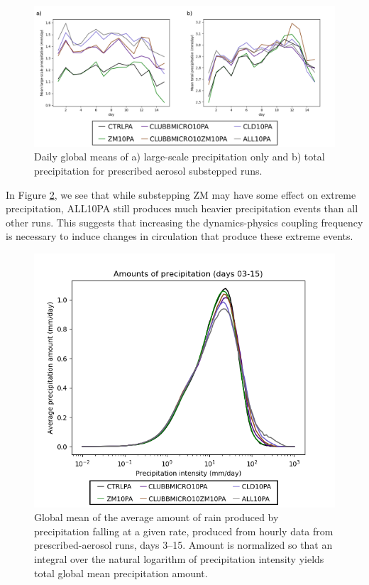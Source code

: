 \documentclass [11pt, proquest] {uwthesis}[2020/02/24]
\begin{document}
\begin{figure}
    \centering
    \includegraphics[width=6.5in]{Figure13.png}
    \caption[Rates of large-scale and total precipitation over time for short prescribed-aerosol EAMv1 runs using different forms of substepping]{Daily global means of a) large-scale precipitation only and b) total precipitation for prescribed aerosol substepped runs.}
    \label{fig:precl-prect-pa}
\end{figure}

In Figure \ref{fig:prec-intensity-pa}, we see that while substepping ZM may have some effect on extreme precipitation, ALL10PA still produces much heavier precipitation events than all other runs. This suggests that increasing the dynamics-physics coupling frequency is necessary to induce changes in circulation that produce these extreme events.

\begin{figure}
    \centering
    \includegraphics[width=6.5in]{PRECT_amount_d03-d15_presaer_legend.png}
    \caption[Comparison between short prescribed-aerosol EAMv1 runs with different substepping, of amount of precipitation falling as a function of intensity of precipitation events]{Global mean of the average amount of rain produced by precipitation falling at a given rate, produced from hourly data from prescribed-aerosol runs, days 3--15. Amount is normalized so that an integral over the natural logarithm of precipitation intensity yields total global mean precipitation amount.}
    \label{fig:prec-intensity-pa}
\end{figure}
\end{document}
